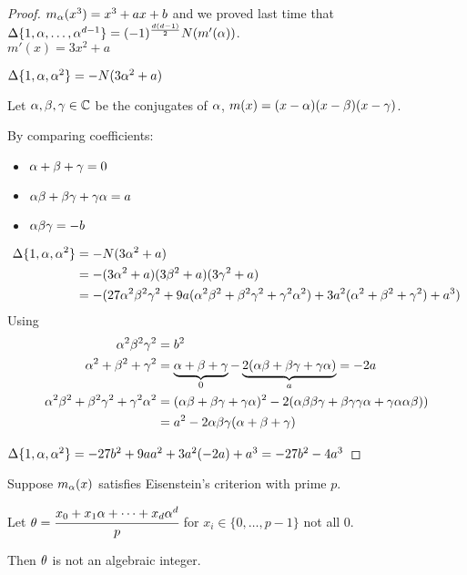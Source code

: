 \documentclass[11pt]{article}
\begin{document}
\begin{proof}
	\spac

	$m_\alpha(x^3) = x^3+ax+b$ and we proved last time that $\Delta\{1, \alpha, \dots, \alpha^{d-1}\} = (-1)^{\frac{d(d-1)}{2}}N(m'(\alpha))$.
\\
	
	$m'(x) = 3x^2 + a$
	\spa

	$\Delta \{1, \alpha, \alpha^2 \} = -N(3\alpha^2 + a)$
	\spa

	Let $\alpha, \beta, \gamma \in \mathbb{C}$ be the conjugates of $\alpha$, $m(x) = (x-\alpha) (x-\beta) (x-\gamma)$.
\spa

	By comparing coefficients:
	\begin{itemize}
		\item{$\alpha + \beta + \gamma= 0$}
		\item{$\alpha\beta + \beta\gamma + \gamma\alpha = a$}
		\item{$\alpha\beta\gamma = -b$}
	\end{itemize}

	\begin{align*}
		\Delta\{1, \alpha, \alpha^2 \} &= -N(3\alpha^2+a)\\
		& = -(3\alpha^2 + a)(3\beta^2 + a)(3\gamma^2 + a)\\
		& = -(27\alpha^2\beta^2\gamma^2 + 9a(\alpha^2\beta^2 + \beta^2\gamma^2 + \gamma^2\alpha^2) + 3a^2(\alpha^2 + \beta^2 + \gamma^2 ) + a^3)
	\end{align*}
	Using 
	\begin{align*}
		\alpha^2\beta^2\gamma^2 &= b^2\\
		\alpha^2  + \beta^2 + \gamma^2 &=\underbrace{\alpha+\beta+\gamma}_{0} - \underbrace{2(\alpha\beta+ \beta\gamma + \gamma\alpha)}_{a} = -2a\\
		\alpha^2\beta^2 + \beta^2\gamma^2 + \gamma^2\alpha^2 &= (\alpha\beta + \beta\gamma + \gamma\alpha)^2 - 2(\alpha\beta\beta\gamma + \beta\gamma\gamma\alpha + \gamma\alpha\alpha\beta ))\\
		&= a^2 - 2\alpha\beta\gamma(\alpha+\beta+\gamma)
	\end{align*}

	$\Delta \{ 1,\alpha, \alpha^2 \} = -27b^2 + 9aa^2 + 3a^2(-2a) + a^3 = -27b^2 -4a^3$
\end{proof}


\begin{prop}
	Suppose $m_\alpha(x)$ satisfies Eisenstein's criterion with prime $p$.
	
	Let $\theta = \cfrac{x_0 + x_1\alpha + \dots+ x_d\alpha^d}{p}$ for $x_i \in \{0,\dots,p-1\}$ not all 0.

	Then $\theta$ is not an algebraic integer.
\end{prop}
\end{document}
